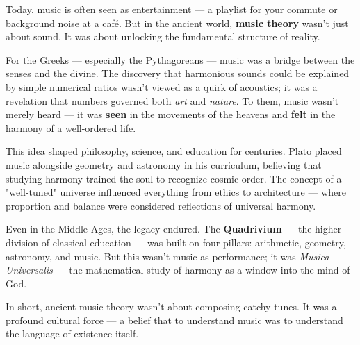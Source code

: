 \begin{tcolorbox}[colback=blue!5!white, colframe=blue!50!black, title={Historical Sidebar: When Music Was the Key to the Cosmos}]

    Today, music is often seen as entertainment — a playlist for your commute or background noise at a café. But in the ancient world, \textbf{music theory} wasn’t just about sound. It was about unlocking the fundamental structure of reality.

    \medskip
    
    For the Greeks — especially the Pythagoreans — music was a bridge between the senses and the divine. The discovery that harmonious sounds could be explained by simple numerical ratios wasn’t viewed as a quirk of acoustics; it was a revelation that numbers governed both \textit{art} and \textit{nature}. To them, music wasn’t merely heard — it was \textbf{seen} in the movements of the heavens and \textbf{felt} in the harmony of a well-ordered life.

    \medskip
    
    This idea shaped philosophy, science, and education for centuries. Plato placed music alongside geometry and astronomy in his curriculum, believing that studying harmony trained the soul to recognize cosmic order. The concept of a "well-tuned" universe influenced everything from ethics to architecture — where proportion and balance were considered reflections of universal harmony.

    \medskip
    
    Even in the Middle Ages, the legacy endured. The \textbf{Quadrivium} — the higher division of classical education — was built on four pillars: arithmetic, geometry, astronomy, and music. But this wasn’t music as performance; it was \textit{Musica Universalis} — the mathematical study of harmony as a window into the mind of God.

    \medskip
    
    In short, ancient music theory wasn’t about composing catchy tunes. It was a profound cultural force — a belief that to understand music was to understand the language of existence itself.
    
\end{tcolorbox}



